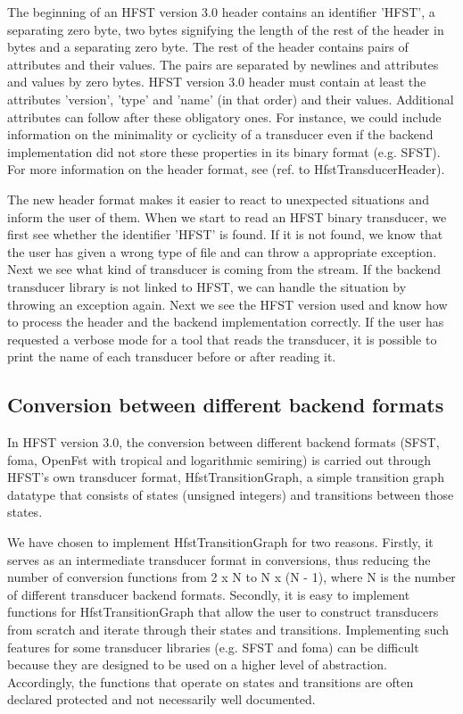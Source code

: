 \documentclass{llncs}
\begin{document}
The beginning of an HFST version 3.0 header contains an identifier
'HFST', a separating zero byte, two bytes signifying the length of
the rest of the header in bytes and a separating zero byte. The rest
of the header contains pairs of attributes and their values. The pairs
are separated by newlines and attributes and values by zero bytes. 
HFST version 3.0 header must contain at least the attributes
'version', 'type' and 'name' (in that order) and their values. 
Additional attributes can follow after these obligatory ones. 
For instance, we could include information on the minimality or
cyclicity of a transducer even if the backend implementation did not
store these properties in its binary format (e.g. SFST). 
For more information on the header format, see (ref. to HfstTransducerHeader).

The new header format makes it easier to react to unexpected
situations and inform the user of them. When we start to read an HFST
binary transducer, we first see whether the identifier 'HFST' is
found. If it is not found, we know that the user has given a wrong
type of file and can throw a appropriate exception. 
Next we see what kind of transducer is coming from the stream. 
If the backend transducer library is not linked to HFST, we can handle
the situation by throwing an exception again. 
Next we see the HFST version used and know how to process the header
and the backend implementation correctly. 
If the user has requested a verbose mode for a tool that reads the
transducer, it is possible to print the name of each transducer 
before or after reading it.

\subsection{Conversion between different backend formats}

In HFST version 3.0, the conversion between different backend formats 
(SFST, foma, OpenFst with tropical and logarithmic semiring) is
carried out through HFST's own transducer format, HfstTransitionGraph, 
a simple transition graph datatype that consists of states (unsigned
integers) and transitions between those states.
 
We have chosen to implement HfstTransitionGraph for two
reasons. Firstly, it serves as an intermediate transducer format in
conversions, thus reducing the number of conversion functions from 2 x
N to N x (N - 1), where N is the number of different transducer
backend formats. Secondly, it is easy to implement functions for 
HfstTransitionGraph that allow the user to construct transducers from 
scratch and iterate through their states and transitions. Implementing
such features for some transducer libraries (e.g. SFST and foma) can
be difficult because they are designed to be used on a higher level of 
abstraction. Accordingly, the functions that operate on states and 
transitions are often declared protected and not necessarily well
documented.
\end{document}
